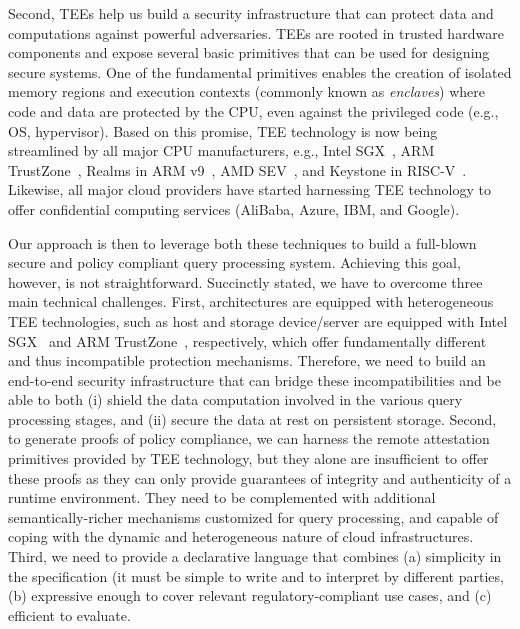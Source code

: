 Second, TEEs help us build a security infrastructure that can protect data and computations against powerful adversaries. TEEs are rooted in trusted hardware components and expose several basic primitives that can be used for designing secure systems. One of the fundamental primitives enables the creation of isolated memory regions and execution contexts (commonly known as \textit{enclaves}) where code and data are protected by the CPU, even against the privileged code (e.g., OS, hypervisor). Based on this promise, TEE technology is now being streamlined by all major CPU manufacturers, e.g., Intel SGX~\cite{intelsgx},  ARM TrustZone~\cite{armtz}, Realms in ARM v9~\cite{arm-realm}, AMD SEV~\cite{amd-sev}, and Keystone in RISC-V~\cite{keystone}. Likewise, all major cloud providers have started harnessing TEE technology to offer confidential computing services (AliBaba, Azure, IBM, and Google).


Our approach is then to leverage both these techniques to build a full-blown secure and policy compliant query processing system. Achieving this goal, however, is not straightforward. Succinctly stated, we have to overcome three main technical challenges. First, \csd architectures are equipped with heterogeneous TEE technologies, such as  host and storage device/server are equipped with Intel SGX~\cite{intelsgx} and ARM TrustZone~\cite{armtz}, respectively, which offer fundamentally different and thus incompatible protection mechanisms. Therefore, we need to build an end-to-end security infrastructure that can bridge these incompatibilities and be able to both (i) shield the data computation involved in the various \csd query processing stages, and (ii) secure the data at rest on persistent storage. Second, to generate proofs of policy compliance, we can harness the remote attestation primitives provided by TEE technology, but they alone are insufficient to offer these proofs as they can only provide guarantees of integrity and authenticity of a runtime environment. They need to be complemented with additional semantically-richer mechanisms customized for query processing, and capable of coping with the dynamic and heterogeneous nature of cloud infrastructures. Third, we need to provide a declarative language that combines (a) simplicity in the specification (it must be simple to write and to interpret by different parties, (b) expressive enough to cover relevant regulatory-compliant use cases, and (c) efficient to evaluate.


